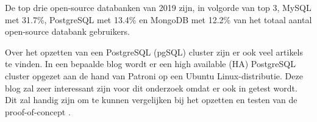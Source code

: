 De top drie open-source databanken van 2019 zijn, in volgorde van top 3, MySQL met 31.7\%, PostgreSQL met 13.4\% en MongoDB met 12.2\% \autocite{Anderson2020} van het totaal aantal open-source databank gebruikers.


Over het opzetten van een PostgreSQL (pgSQL) cluster zijn er ook veel artikels te vinden. In een bepaalde blog wordt er een high available (HA) PostgreSQL cluster \autocite{2019} opgezet aan de hand van Patroni op een Ubuntu Linux-distributie. Deze blog zal zeer interessant zijn voor dit onderzoek omdat er ook in getest wordt. Dit zal handig zijn om te kunnen vergelijken bij het opzetten en testen van de proof-of-concept .





